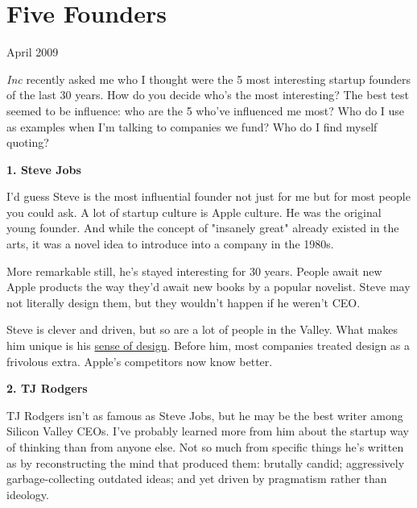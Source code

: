 \chapter{Five Founders}


            
              
                

April 2009

\emph{Inc} recently asked me who I
                  thought were the 5 most interesting startup founders of the
                  last 30 years. How do you decide who's the most interesting?
                  The best test seemed to be influence: who are the 5 who've
                  influenced me most? Who do I use as examples when I'm talking
                  to companies we fund? Who do I find myself quoting?

\textbf{1. Steve Jobs}

I'd guess Steve is the most influential founder
                  not just for me but for most people you could ask. A lot of
                  startup culture is Apple culture. He was the original young
                  founder. And while the concept of "insanely great" already
                  existed in the arts, it was a novel idea to introduce into a
                  company in the 1980s.

More remarkable still, he's
                  stayed interesting for 30 years. People await new Apple
                  products the way they'd await new books by a popular novelist.
                  Steve may not literally design them, but they wouldn't happen
                  if he weren't CEO.

Steve is clever and driven, but
                  so are a lot of people in the Valley. What makes him unique is
                  his \href{http://www.paulgraham.com/taste.html}{sense of design}. Before him, most
                  companies treated design as a frivolous extra. Apple's
                  competitors now know better.

\textbf{2. TJ Rodgers}

TJ Rodgers isn't as famous as Steve Jobs, but he
                  may be the best writer among Silicon Valley CEOs. I've
                  probably learned more from him about the startup way of
                  thinking than from anyone else. Not so much from specific
                  things he's written as by reconstructing the mind that
                  produced them: brutally candid; aggressively
                  garbage-collecting outdated ideas; and yet driven by
                  pragmatism rather than ideology.

